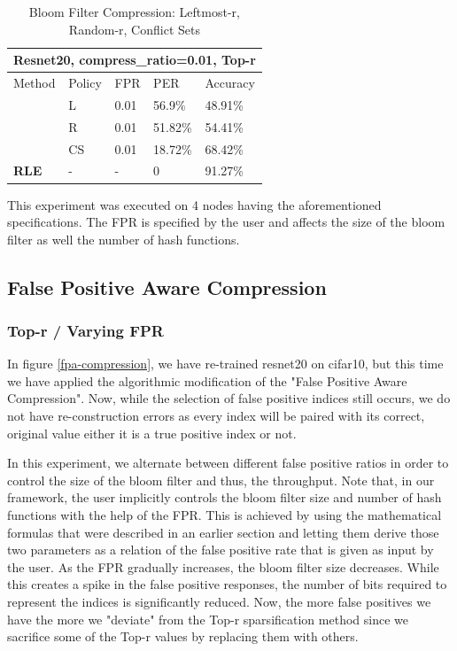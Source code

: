     \begin{table}[h!]
    \footnotesize
     \centering
    \begin{tabular}{ |p{3cm}||p{1cm}|p{1cm}|p{1.3cm}|p{1.5cm}|}
    \hline
    \multicolumn{5}{|c|}{\textbf{\footnotesize Resnet20, compress\_ratio=0.01, Top-r}} \\
    \hline
    \rule{0pt}{3ex}
    	Method & Policy & FPR  & PER & Accuracy\\
    \hline
    \rule{0pt}{3ex}
    \multirow{3}{*}{\textbf{Bloom}}
    & L    &0.01     &56.9\%   &48.91\%\\
    & R    &0.01     &51.82\%   &54.41\%\\
    & CS   &0.01     &18.72\%   &68.42\%\\
    \hline
    \rule{0pt}{3ex}
    \textbf{RLE}    & - & - &0   &91.27\%\\
    \hline
    \end{tabular}
    \caption{Bloom Filter Compression: Leftmost-r, Random-r, Conflict Sets}
    
    This experiment was executed on 4 nodes having the aforementioned specifications.
    The FPR is specified by the user and affects the size of the bloom filter as well 
    the number of hash functions.
    \label{table:1}
    \end{table}
    
    \subsection{False Positive Aware Compression}

    \subsubsection{Top-r / Varying FPR}
    In figure \ref{fpa-compression}, we have re-trained resnet20 on cifar10, but this time we have applied the algorithmic modification of the "False Positive Aware Compression". 
    Now, while the selection of false positive indices still occurs, we do not have re-construction errors as every index will be paired with its correct, original value either it is a true positive index or not.
    
    In this experiment, we alternate between different false positive ratios in order to control the size of the bloom filter and thus, the throughput.
    Note that, in our framework, the user implicitly controls the bloom filter size and number of hash functions with the help of the FPR.
    This is achieved by using the mathematical formulas that were described in an earlier section and letting them derive those two parameters as a relation of the false positive rate that is given as input by the user.
    As the FPR gradually increases, the bloom filter size decreases.
    While this creates a spike in the false positive responses, the number of bits required to represent the indices is significantly reduced.
    Now, the more false positives we have the more we "deviate" from the Top-r sparsification method since we sacrifice some of the Top-r values by replacing them with others.
    
